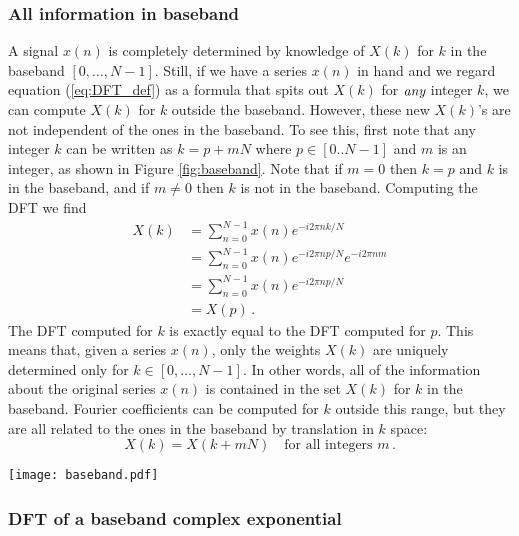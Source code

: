 \subsubsection{All information in baseband}

A signal $x(n)$ is completely determined by knowledge of $X(k)$ for $k$ in the baseband $[0,\ldots,N-1]$.
Still, if we have a series $x(n)$ in hand and we regard equation (\ref{eq:DFT_def}) as a formula that spits out $X(k)$ for $\emph{any}$ integer $k$, we can compute $X(k)$ for $k$ outside the baseband.
However, these new $X(k)$'s are not independent of the ones in the baseband.
To see this, first note that any integer $k$ can be written as $k=p+mN$ where $p \in [0..N-1]$ and $m$ is an integer, as shown in Figure \ref{fig:baseband}.
Note that if $m=0$ then $k=p$ and $k$ is in the baseband, and if $m \neq 0$ then $k$ is not in the baseband.
Computing the DFT we find
\begin{align}
X(k) &= \sum_{n=0}^{N-1} x(n) e^{-i2\pi nk/N}\\
&= \sum_{n=0}^{N-1} x(n) e^{-i2\pi np/N} e^{-i2\pi nm} \\
&= \sum_{n=0}^{N-1} x(n)e^{-i2\pi np/N} \\
&= X(p) \, .
\end{align}
The DFT computed for $k$ is exactly equal to the DFT computed for $p$.
This means that, given a series $x(n)$, only the weights $X(k)$ are uniquely determined only for $k \in [0, \ldots , N-1]$.
In other words, all of the information about the original series $x(n)$ is contained in the set $X(k)$ for $k$ in the baseband.
Fourier coefficients can be computed for $k$ outside this range, but they are all related to the ones in the baseband by translation in $k$ space:
\begin{equation}
X(k) = X(k+mN) \quad \textrm{for all integers }m \, . \label{eq:translational_symmetry}
\end{equation}

\begin{figure*}[t]
\begin{centering}
\texttt{[image: baseband.pdf]}
\par\end{centering}
\caption{Illustration of the baseband and higher bands.}
\label{fig:baseband}
\end{figure*}


\subsubsection{DFT of a baseband complex exponential}

